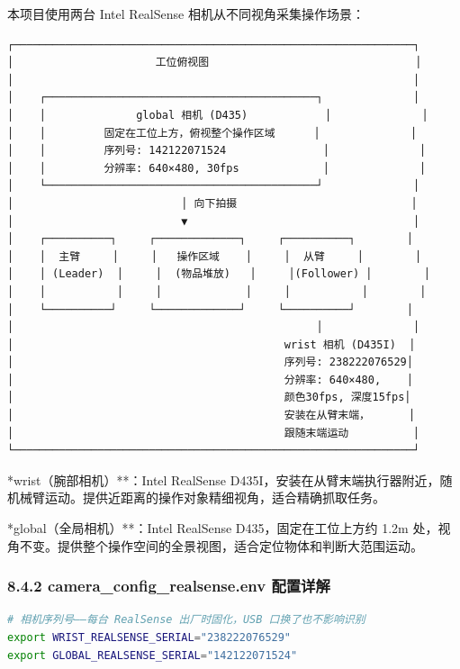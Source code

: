 \documentclass[UTF8,a4paper,11pt]{ctexart}
\begin{document}
{本项目使用两台 Intel RealSense 相机从不同视角采集操作场景：

\begin{lstlisting}[language=text]
┌──────────────────────────────────────────────────────────────┐
│                      工位俯视图                                │
│                                                              │
│    ┌──────────────────────────────────────────┐              │
│    │              global 相机 (D435)            │              │
│    │         固定在工位上方，俯视整个操作区域      │              │
│    │         序列号: 142122071524               │              │
│    │         分辨率: 640×480, 30fps             │              │
│    └──────────────────────────────────────────┘              │
│                          │ 向下拍摄                           │
│                          ▼                                   │
│    ┌──────────┐     ┌─────────────┐     ┌──────────┐        │
│    │  主臂     │     │   操作区域    │     │  从臂     │        │
│    │ (Leader)  │     │  (物品堆放)   │     │(Follower) │        │
│    │           │     │             │     │           │        │
│    └──────────┘     └─────────────┘     └──────────┘        │
│                                               │              │
│                                          wrist 相机 (D435I)  │
│                                          序列号: 238222076529│
│                                          分辨率: 640×480,    │
│                                          颜色30fps, 深度15fps│
│                                          安装在从臂末端，      │
│                                          跟随末端运动          │
└──────────────────────────────────────────────────────────────┘
\end{lstlisting}

\item **wrist（腕部相机）**：Intel RealSense D435I，安装在从臂末端执行器附近，随机械臂运动。提供近距离的操作对象精细视角，适合精确抓取任务。
\item **global（全局相机）**：Intel RealSense D435，固定在工位上方约 1.2m 处，视角不变。提供整个操作空间的全景视图，适合定位物体和判断大范围运动。

\subsubsection{8.4.2 camera_config_realsense.env 配置详解}

\begin{lstlisting}[language=bash]
# 相机序列号——每台 RealSense 出厂时固化，USB 口换了也不影响识别
export WRIST_REALSENSE_SERIAL="238222076529"
export GLOBAL_REALSENSE_SERIAL="142122071524"


\end{lstlisting}}
\end{document}
